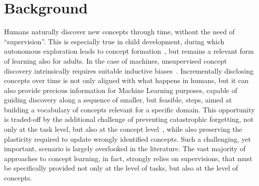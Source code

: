 \section{Background}
Humans naturally discover new concepts through time, without the need of ``supervision''. This is especially true in child development, during which autonomous exploration leads to concept formation~\cite{damon2008child}, but remains a relevant form of learning also for adults.
In the case of machines, unsupervised concept discovery intrinsically requires suitable inductive biases~\cite{locatello2019challenging}. Incrementally disclosing concepts over time is not only aligned with what happens in humans, but it can also provide precious information for Machine Learning purposes, capable of guiding discovery along a sequence of smaller, but feasible, steps, aimed at building a vocabulary of concepts relevant for a specific domain.
This opportunity is traded-off by the additional challenge of preventing catastrophic forgetting, not only at the task level, but also at the concept level~\cite{marconato2023neuro}, while also preserving the plasticity required to update wrongly identified concepts. Such a challenging, yet important, scenario is largely overlooked in the literature.
%
The vast majority of approaches to concept learning, in fact, strongly relies on supervisions, that must be specifically provided not only at the level of tasks, but also at the level of concepts.
%
%
